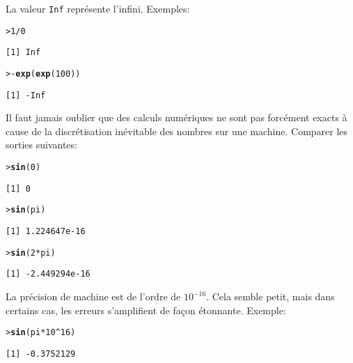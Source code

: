 \documentclass[11pt]{article}
\makeatletter
\numberwithin{equation}{section}
\theoremstyle{remark}
\newenvironment{kframe}{%
 \def\at@end@of@kframe{}%
 \ifinner\ifhmode%
  \def\at@end@of@kframe{\end{minipage}}%
  \begin{minipage}{\columnwidth}%
 \fi\fi%
 \def\FrameCommand##1{\hskip\@totalleftmargin \hskip-\fboxsep
 \colorbox{shadecolor}{##1}\hskip-\fboxsep
     \hskip-\linewidth \hskip-\@totalleftmargin \hskip\columnwidth}%
 \MakeFramed {\advance\hsize-\width
   \@totalleftmargin\z@ \linewidth\hsize
   \@setminipage}}%
 {\par\unskip\endMakeFramed%
 \at@end@of@kframe}
\newenvironment{knitrout}{}{}
\newcommand{\hlnum}[1]{\textcolor[rgb]{0.43,0.21,0.1}{#1}}%
\newcommand{\hlopt}[1]{\textcolor[rgb]{0,0,0}{#1}}%
\newcommand{\hlstd}[1]{\textcolor[rgb]{0,0.2,0.4}{#1}}%
\newcommand{\hlkwd}[1]{\textcolor[rgb]{0.76,0.13,0.28}{\textbf{#1}}}%
\makeatother
\begin{document}
La valeur \texttt{Inf} représente l'infini. Exemples:
\begin{knitrout}
\color{fgcolor}\begin{kframe}
\begin{alltt}
\hlstd{> }\hlnum{1}\hlopt{/}\hlnum{0}
\end{alltt}
\begin{verbatim}
[1] Inf
\end{verbatim}
\begin{alltt}
\hlstd{> }\hlopt{-}\hlkwd{exp}\hlstd{(}\hlkwd{exp}\hlstd{(}\hlnum{100}\hlstd{))}
\end{alltt}
\begin{verbatim}
[1] -Inf
\end{verbatim}
\end{kframe}
\end{knitrout}
Il faut jamais oublier que des calculs numériques ne sont pas forcément exacts à cause de la discrétisation inévitable des nombres sur une machine. Comparer les sorties suivantes:
\begin{knitrout}
\color{fgcolor}\begin{kframe}
\begin{alltt}
\hlstd{> }\hlkwd{sin}\hlstd{(}\hlnum{0}\hlstd{)}
\end{alltt}
\begin{verbatim}
[1] 0
\end{verbatim}
\begin{alltt}
\hlstd{> }\hlkwd{sin}\hlstd{(pi)}
\end{alltt}
\begin{verbatim}
[1] 1.224647e-16
\end{verbatim}
\begin{alltt}
\hlstd{> }\hlkwd{sin}\hlstd{(}\hlnum{2}\hlopt{*}\hlstd{pi)}
\end{alltt}
\begin{verbatim}
[1] -2.449294e-16
\end{verbatim}
\end{kframe}
\end{knitrout}
La précision de machine est de l'ordre de $10^{-16}$. Cela semble petit, mais dans certains cas, les erreurs s'amplifient de façon étonnante. Exemple:
\begin{knitrout}
\color{fgcolor}\begin{kframe}
\begin{alltt}
\hlstd{> }\hlkwd{sin}\hlstd{(pi}\hlopt{*}\hlnum{10}\hlopt{^}\hlnum{16}\hlstd{)}
\end{alltt}
\begin{verbatim}
[1] -0.3752129
\end{verbatim}
\end{kframe}
\end{knitrout}
\end{document}
